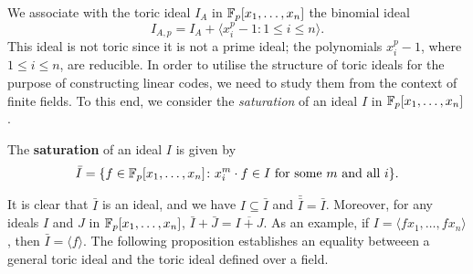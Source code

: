 \documentclass[english,bachelor]{liumaiex}
\begin{document}
\begin{comment}
The following proposition describes the form of generators for the $l^\textrm{th}$ power of a toric ideal.

\begin{prop}
Let $\mathbb{F}$ be a field and let $A$ be a matrix in $\mathbb{Z}_{0}^{m\times n}$. The toric ideal $I_A$ in $\polyfield$ is generated by pure binomials,
\begin{displaymath}
I_A=\langle x^{\alpha}-x^{\beta}\colon A\alpha=A\beta, \ \gcd(x^{\alpha},x^{\beta})=1\rangle.
\end{displaymath}
Let $l\geq1$ be an integer. The $l^{\textrm{th}}$ power of $I_A$ is generated by elements of the form
\begin{displaymath}
\sum_{i=0}^{2^{l-1}-1}(-1)^i(x^\alpha-x^\beta),
\end{displaymath}
where $\alpha_i\in\naturals, A\alpha=A\beta$, and $\gcd(x^\alpha,x^\beta)=1$.
\end{prop}
\begin{proof}
For a proof, see \cite[pp. 52-53]{phd}.
\end{proof}
\end{comment}
We associate with the toric ideal $I_A$ in $\mathbb{F}_p[x_1,\dots,x_n]$ the binomial ideal
\begin{displaymath}
I_{A,p}=I_A+\langle x_i^p-1\colon 1\leq i\leq n\rangle.
\end{displaymath}
This ideal is not toric since it is not a prime ideal; the polynomials $x_i^p-1$, where $1\leq i\leq n$, are reducible. In order to utilise the structure of toric ideals for the purpose of constructing linear codes, we need to study them from the context of finite fields. To this end, we consider the \emph{saturation} of an ideal $I$ in $\mathbb{F}_p[x_1,\dots,x_n]$.
\begin{define}
The \textbf{saturation} of an ideal $I$ is given by
\begin{displaymath}
\bar{I}=\{f\in\mathbb{F}_p[x_1,\dots,x_n]\colon x_i^m\cdot f\in I \textrm{ for some } m \textrm{ and all }i\}.
\end{displaymath}
\end{define}
It is clear that $\bar{I}$ is an ideal, and we have $I\subseteq\bar{I}$ and $\bar{\bar{I}}=\bar{I}$. Moreover, for any ideals $I$ and $J$ in $\mathbb{F}_p[x_1,\dots,x_n]$, $\bar{I}+\bar{J}=\overline{I+J}$. As an example, if $I=\langle fx_1,\dots,fx_n\rangle$, then $\bar{I}=\langle f\rangle$. The following proposition establishes an equality betweeen a general toric ideal and the toric ideal defined over a field.
\end{document}
